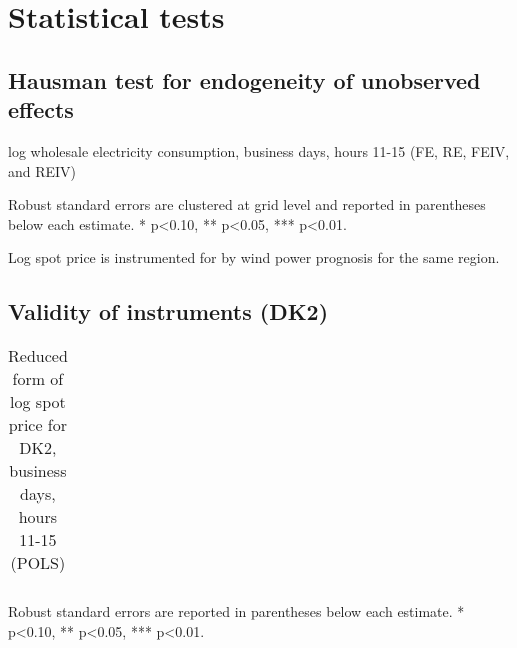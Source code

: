\section{Statistical tests}
\label{app:statistical_tests}

\subsection{Hausman test for endogeneity of unobserved effects}
\label{app:hausman}
\begin{table}[H]
\centering
\begin{threeparttable}
  \caption{log wholesale electricity consumption, business days, hours 11-15 (FE, RE, FEIV, and REIV)}
  \label{tab:ws_fe}
  \footnotesize
    
    \begin{tablenotes}
    \item Robust standard errors are clustered at grid level and reported in parentheses below each estimate. * p<0.10, ** p<0.05, *** p<0.01.
    \item Log spot price is instrumented for by wind power prognosis for the same region.
  \end{tablenotes}
\end{threeparttable}
\end{table}

\clearpage

\subsection{Validity of instruments (DK2)}
\label{app:validity}

\begin{table}[H]
\begin{threeparttable}
  \centering
  \caption{Reduced form of log spot price for DK2, business days, hours 11-15 (POLS)}
  \label{tab:reduced_form_price_dk2}
  \footnotesize
  \begin{tabular}{lcccc}
         
  \end{tabular}
    \begin{tablenotes}
        \item Robust standard errors are reported in parentheses below each estimate. * p<0.10, ** p<0.05, *** p<0.01.
    \end{tablenotes}
\end{threeparttable}
\end{table}

\clearpage

